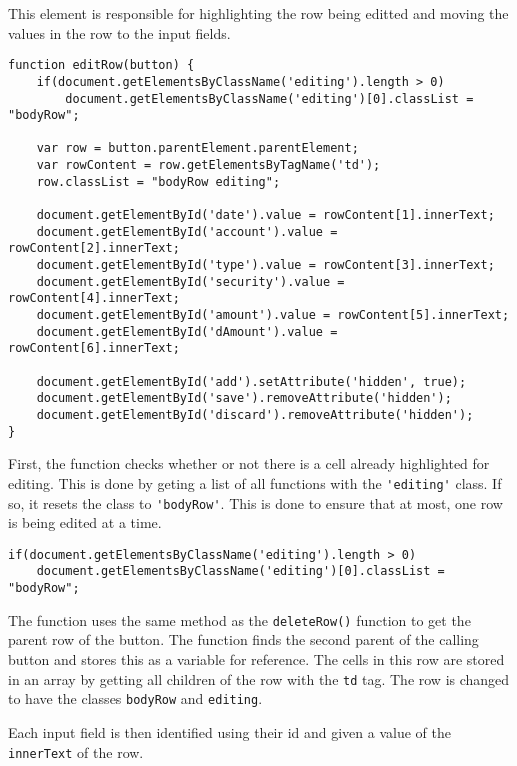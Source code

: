 \documentclass[letterpaper]{article}
\begin{document}
This element is responsible for highlighting the row being editted and moving the values in the row to the input fields.

\begin{lstlisting}[firstnumber=177]
function editRow(button) {
    if(document.getElementsByClassName('editing').length > 0)
        document.getElementsByClassName('editing')[0].classList = "bodyRow";

    var row = button.parentElement.parentElement;
    var rowContent = row.getElementsByTagName('td');
    row.classList = "bodyRow editing";

    document.getElementById('date').value = rowContent[1].innerText;
    document.getElementById('account').value = rowContent[2].innerText;
    document.getElementById('type').value = rowContent[3].innerText;
    document.getElementById('security').value = rowContent[4].innerText;
    document.getElementById('amount').value = rowContent[5].innerText;
    document.getElementById('dAmount').value = rowContent[6].innerText;

    document.getElementById('add').setAttribute('hidden', true);
    document.getElementById('save').removeAttribute('hidden');
    document.getElementById('discard').removeAttribute('hidden');
}
\end{lstlisting}

First, the function checks whether or not there is a cell already highlighted for editing.
This is done by geting a list of all functions with the \lstinline{'editing'} class.
If so, it resets the class to \lstinline{'bodyRow'}.
This is done to ensure that at most, one row is being edited at a time.

\begin{lstlisting}[firstnumber=178]
if(document.getElementsByClassName('editing').length > 0)
    document.getElementsByClassName('editing')[0].classList = "bodyRow";
\end{lstlisting}

The function uses the same method as the \lstinline{deleteRow()} function to get the parent row of the button.
The function finds the second parent of the calling button and stores this as a variable for reference.
The cells in this row are stored in an array by getting all children of the row with the \lstinline{td} tag.
The row is changed to have the classes \lstinline{bodyRow} and \lstinline{editing}.

Each input field is then identified using their id and given a value of the \lstinline{innerText} of the row.
\end{document}
